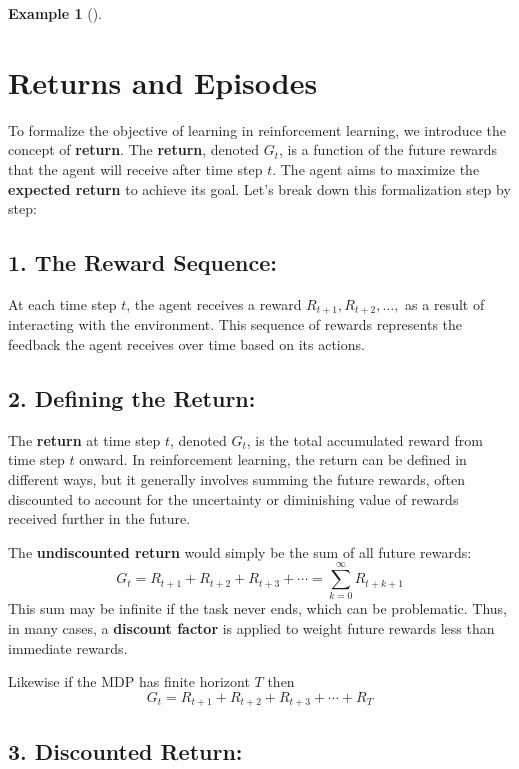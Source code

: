 \documentclass[
  letterpaper,
]{krantz}
\theoremstyle{plain}
\theoremstyle{definition}
\newtheorem{example}{Example}[chapter]
\theoremstyle{definition}
\theoremstyle{remark}
\begin{document}
\begin{example}[]
\section{Returns and Episodes}\label{returns-and-episodes}

To formalize the objective of learning in reinforcement learning, we
introduce the concept of \textbf{return}. The \textbf{return}, denoted
\(G_t\), is a function of the future rewards that the agent will receive
after time step \(t\). The agent aims to maximize the \textbf{expected
return} to achieve its goal. Let's break down this formalization step by
step:

\subsection{\texorpdfstring{1. \textbf{The Reward
Sequence}:}{1. The Reward Sequence:}}\label{the-reward-sequence}

At each time step \(t\), the agent receives a reward
\(R_{t+1}, R_{t+2},\dots,\) as a result of interacting with the
environment. This sequence of rewards represents the feedback the agent
receives over time based on its actions.

\subsection{\texorpdfstring{2. \textbf{Defining the
Return}:}{2. Defining the Return:}}\label{defining-the-return}

The \textbf{return} at time step \(t\), denoted \(G_t\), is the total
accumulated reward from time step \(t\) onward. In reinforcement
learning, the return can be defined in different ways, but it generally
involves summing the future rewards, often discounted to account for the
uncertainty or diminishing value of rewards received further in the
future.

The \textbf{undiscounted return} would simply be the sum of all future
rewards: \[
   G_t = R_{t+1} + R_{t+2} + R_{t+3} + \cdots = \sum_{k=0}^{\infty} R_{t+k+1}
\] This sum may be infinite if the task never ends, which can be
problematic. Thus, in many cases, a \textbf{discount factor} is applied
to weight future rewards less than immediate rewards.

Likewise if the MDP has finite horizont \(T\) then
\[G_t = R_{t+1} + R_{t+2} + R_{t+3} + \cdots + R_{T}\]

\subsection{\texorpdfstring{3. \textbf{Discounted
Return}:}{3. Discounted Return:}}\label{discounted-return}


\end{example}
\end{document}
